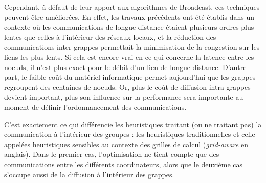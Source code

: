 %	
%	


Cependant, à défaut de leur apport aux algorithmes de Broadcast, ces
techniques peuvent être améliorées. En effet, les travaux précédents
ont été établis dans un contexte où les communications de longue distance
étaient plusieurs ordres plus lentes que celles à l'intérieur des
réseaux locaux, et la réduction des communications inter-grappes permettait
la minimisation de la congestion sur les liens les plus lents. Si
cela est encore vrai en ce qui concerne la latence entre les noeuds,
il n'est plus exact pour le débit d'un lien de longue distance. D'autre
part, le faible coût du matériel informatique permet aujourd'hui que
les grappes regroupent des centaines de noeuds. Or, plus le coût de
diffusion \og intra-grappes \fg{} devient important, plus son influence
sur la performance sera importante au moment de définir l'ordonnancement
des communications.

C'est exactement ce qui différencie les heuristiques traitant (ou
ne traitant pas) la communication à l'intérieur des groupes : les
heuristiques \og traditionnelles \fg{} et celle appelées \og heuristiques
sensibles au contexte des grilles de calcul \fg{} (\og \emph{grid-aware} \fg{}
en anglais). Dans le premier cas, l'optimisation ne tient compte que
des communications entre les différents coordinateurs, alors que le
deuxième cas s'occupe aussi de la diffusion à l'intérieur des grappes. 

